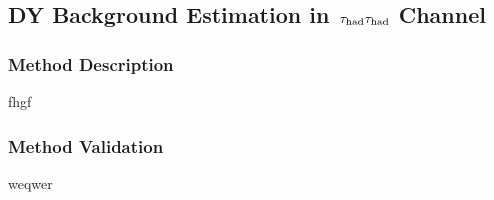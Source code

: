 \subsection{\texorpdfstring{DY Background Estimation in $\,\tau_{\rm had}\tau_{\rm had}$ Channel}{DY Background Estimation in tau-tau Channel}}
\subsubsection{Method Description}
fhgf
\subsubsection{Method Validation}
weqwer
